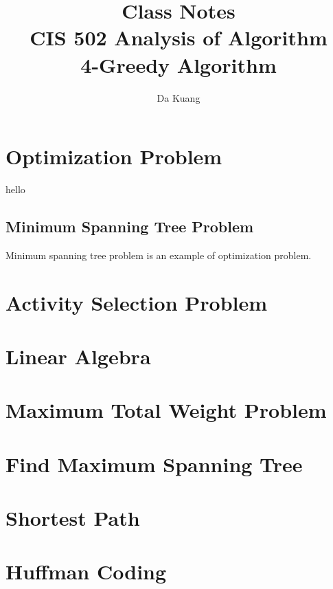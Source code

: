 \documentclass[en,hazy,blue,screen,14pt]{elegantnote}
\title{Class Notes\\CIS 502 Analysis of Algorithm\\4-Greedy Algorithm}
\author{Da Kuang}
\institute{University of Pennsylvania}
\date{}
\begin{document}
\maketitle
\newpage

\section{Optimization Problem}

hello
\subsection{Minimum Spanning Tree Problem}
Minimum spanning tree problem is an example of optimization problem.


\section{Activity Selection Problem}


\section{Linear Algebra}


\section{Maximum Total Weight Problem}

\section{Find Maximum Spanning Tree}

\section{Shortest Path}

\section{Huffman Coding}

\end{document}
